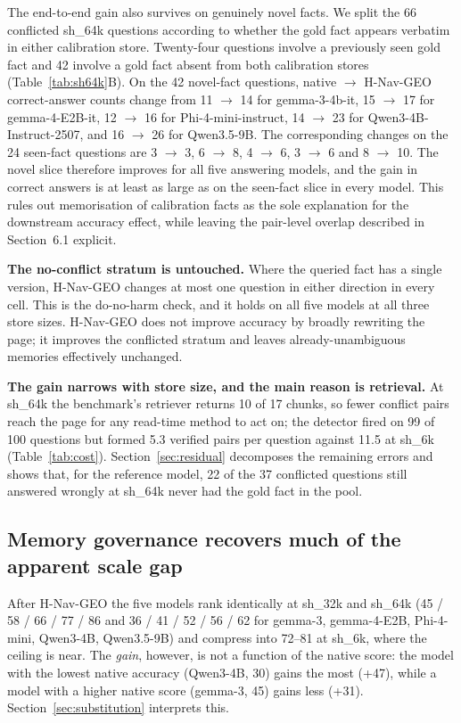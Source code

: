 \documentclass[journal=jcisd8,manuscript=article]{achemso}
\begin{document}
The end-to-end gain also survives on genuinely novel facts. We split the 66 conflicted sh\_64k questions according to whether the gold fact appears verbatim in either calibration store. Twenty-four questions involve a previously seen gold fact and 42 involve a gold fact absent from both calibration stores (Table~\ref{tab:sh64k}B). On the 42 novel-fact questions, native $\to$ H-Nav-GEO correct-answer counts change from 11 $\to$ 14 for gemma-3-4b-it, 15 $\to$ 17 for gemma-4-E2B-it, 12 $\to$ 16 for Phi-4-mini-instruct, 14 $\to$ 23 for Qwen3-4B-Instruct-2507, and 16 $\to$ 26 for Qwen3.5-9B. The corresponding changes on the 24 seen-fact questions are 3 $\to$ 3, 6 $\to$ 8, 4 $\to$ 6, 3 $\to$ 6 and 8 $\to$ 10. The novel slice therefore improves for all five answering models, and the gain in correct answers is at least as large as on the seen-fact slice in every model. This rules out memorisation of calibration facts as the sole explanation for the downstream accuracy effect, while leaving the pair-level overlap described in Section~6.1 explicit.

\textbf{The no-conflict stratum is untouched.} Where the queried fact has a single version, H-Nav-GEO changes at most one question in either direction in every cell. This is the do-no-harm check, and it holds on all five models at all three store sizes. H-Nav-GEO does not improve accuracy by broadly rewriting the page; it improves the conflicted stratum and leaves already-unambiguous memories effectively unchanged.

\textbf{The gain narrows with store size, and the main reason is retrieval.} At sh\_64k the benchmark's retriever returns 10 of 17 chunks, so fewer conflict pairs reach the page for any read-time method to act on; the detector fired on 99 of 100 questions but formed 5.3 verified pairs per question against 11.5 at sh\_6k (Table~\ref{tab:cost}). Section~\ref{sec:residual} decomposes the remaining errors and shows that, for the reference model, 22 of the 37 conflicted questions still answered wrongly at sh\_64k never had the gold fact in the pool.

\subsection{Memory governance recovers much of the apparent scale gap}\label{sec:scale-results}

After H-Nav-GEO the five models rank identically at sh\_32k and sh\_64k (45 / 58 / 66 / 77 / 86 and 36 / 41 / 52 / 56 / 62 for gemma-3, gemma-4-E2B, Phi-4-mini, Qwen3-4B, Qwen3.5-9B) and compress into 72--81 at sh\_6k, where the ceiling is near. The \emph{gain}, however, is not a function of the native score: the model with the lowest native accuracy (Qwen3-4B, 30) gains the most (+47), while a model with a higher native score (gemma-3, 45) gains less (+31). Section~\ref{sec:substitution} interprets this.
\end{document}
